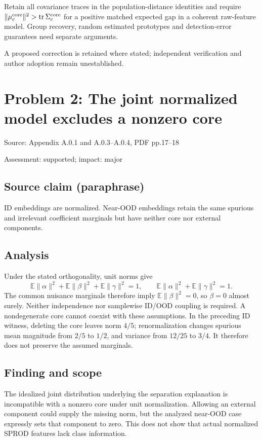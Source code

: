 \documentclass[11pt]{article}
\begin{document}
Retain all covariance traces in the population-distance identities and require \(\|\mu_c^{\rm core}\|^2>\operatorname{tr}\Sigma_c^{\rm core}\) for a positive matched expected gap in a coherent raw-feature model. Group recovery, random estimated prototypes and detection-error guarantees need separate arguments.

A proposed correction is retained where stated; independent verification and author adoption remain unestablished.

\section*{Problem 2: The joint normalized model excludes a nonzero core}

Source: Appendix A.0.1 and A.0.3–A.0.4, PDF pp.17–18

Assessment: supported; impact: major

\subsection*{Source claim (paraphrase)}

ID embeddings are normalized. Near-OOD embeddings retain the same spurious and irrelevant coefficient marginals but have neither core nor external components.

\subsection*{Analysis}

Under the stated orthogonality, unit norms give \[\mathbb E\|\alpha\|^2+\mathbb E\|\beta\|^2+\mathbb E\|\gamma\|^2=1,\qquad \mathbb E\|\alpha\|^2+\mathbb E\|\gamma\|^2=1.\] The common nuisance marginals therefore imply \(\mathbb E\|\beta\|^2=0\), so \(\beta=0\) almost surely. Neither independence nor samplewise ID/OOD coupling is required. A nondegenerate core cannot coexist with these assumptions. In the preceding ID witness, deleting the core leaves norm \(4/5\); renormalization changes spurious mean magnitude from \(2/5\) to \(1/2\), and variance from \(12/25\) to \(3/4\). It therefore does not preserve the assumed marginals.

\subsection*{Finding and scope}

The idealized joint distribution underlying the separation explanation is incompatible with a nonzero core under unit normalization. Allowing an external component could supply the missing norm, but the analyzed near-OOD case expressly sets that component to zero. This does not show that actual normalized SPROD features lack class information.
\end{document}
